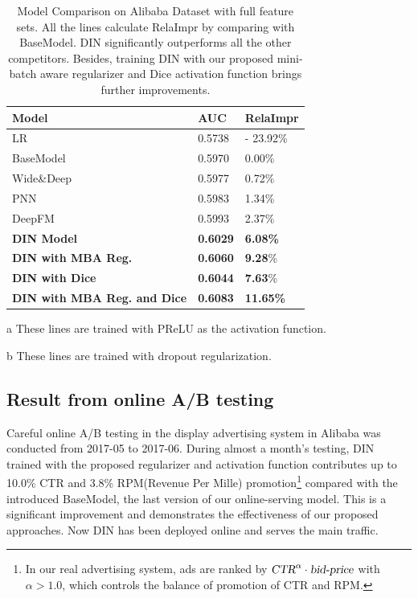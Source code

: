 \begin{table}[]
\caption{Model Comparison on Alibaba Dataset with full feature sets. All the lines calculate RelaImpr by comparing with BaseModel. 
DIN significantly outperforms all the other competitors. Besides, training DIN with our proposed mini-batch aware regularizer and Dice activation function brings further improvements.}
\small
\centering
\begin{threeparttable}
\begin{tabular}{p{4cm} p{1.5cm}<{\centering} p{1.5cm}<{\centering}}
\toprule
Model & AUC & RelaImpr \\ \midrule
LR                                  & 0.5738 &  - 23.92\%  \\    
BaseModel\tnote{a,b}               & 0.5970 &  0.00\% \\
Wide\&Deep\tnote{a,b}               & 0.5977 &  0.72\%  \\
PNN\tnote{a,b}                      & 0.5983 &  1.34\%  \\
DeepFM\tnote{a,b}                   & 0.5993 &  2.37\%  \\
\textbf{DIN Model\tnote{a,b}}       & \textbf{0.6029} & \textbf{6.08\%} \\
\textbf{DIN with MBA Reg.\tnote{a}} & \textbf{0.6060} &  \textbf{9.28}\%  \\
\textbf{DIN with Dice \tnote{b}}    & \textbf{0.6044} &  \textbf{7.63}\%  \\
\textbf{DIN with MBA Reg. and Dice} & \textbf{0.6083} &  \textbf{11.65\%}  \\ \bottomrule
\end{tabular}
\begin{tablenotes}%
        \item[a] These lines are trained with PReLU as the activation function. 
        \item[b] These lines are trained with dropout regularization. 
      \end{tablenotes}
      \end{threeparttable}
\label{table:ali}
\end{table}


\subsection{Result from online A/B testing}
Careful online A/B testing in the display advertising system in Alibaba was conducted from 2017-05 to 2017-06. 
During almost a month's testing,  DIN trained with the proposed regularizer and activation function contributes up to 10.0\% CTR and 3.8\% RPM(Revenue Per Mille) promotion\footnote{In our real advertising system, ads are ranked by $\textsl{CTR}^\alpha \cdot \textsl{bid-price}$ with $\alpha > 1.0$, which controls the balance of promotion of CTR and RPM.} compared with the introduced BaseModel, the last version of our online-serving model. This is a significant improvement and demonstrates the effectiveness of our proposed approaches. Now DIN has been deployed online and serves the main traffic.  

